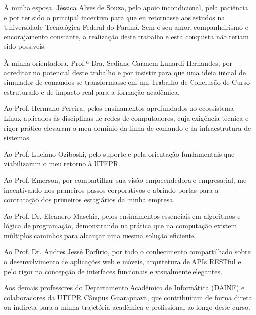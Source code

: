 \begin{agradecimentos}
À minha esposa, Jéssica Alves de Souza, pelo apoio incondicional, pela paciência e por ter sido o principal incentivo para que eu retornasse aos estudos na Universidade Tecnológica Federal do Paraná. Sem o seu amor, companheirismo e encorajamento constante, a realização deste trabalho e esta conquista não teriam sido possíveis.

À minha orientadora, Prof.ª Dra. Sediane Carmem Lunardi Hernandes, por acreditar no potencial deste trabalho e por insistir para que uma ideia inicial de simulador de comandos se transformasse em um Trabalho de Conclusão de Curso estruturado e de impacto real para a formação acadêmica.

Ao Prof. Hermano Pereira, pelos ensinamentos aprofundados no ecossistema Linux aplicados às disciplinas de redes de computadores, cuja exigência técnica e rigor prático elevaram o meu domínio da linha de comando e da infraestrutura de sistemas.

Ao Prof. Luciano Ogiboski, pelo suporte e pela orientação fundamentais que viabilizaram o meu retorno à UTFPR.

Ao Prof. Emerson, por compartilhar sua visão empreendedora e empresarial, me incentivando nos primeiros passos corporativos e abrindo portas para a contratação dos primeiros estagiários da minha empresa.

Ao Prof. Dr. Eleandro Maschio, pelos ensinamentos essenciais em algoritmos e lógica de programação, demonstrando na prática que na computação existem múltiplos caminhos para alcançar uma mesma solução eficiente.

Ao Prof. Dr. Andres Jessé Porfírio, por todo o conhecimento compartilhado sobre o desenvolvimento de aplicações web e móveis, arquitetura de APIs RESTful e pelo rigor na concepção de interfaces funcionais e visualmente elegantes.

Aos demais professores do Departamento Acadêmico de Informática (DAINF) e colaboradores da UTFPR Câmpus Guarapuava, que contribuíram de forma direta ou indireta para a minha trajetória acadêmica e profissional ao longo deste curso.
\end{agradecimentos}
